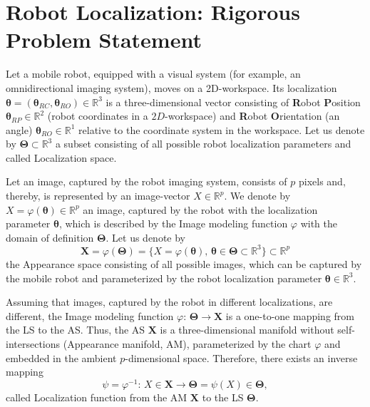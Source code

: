 \documentclass[conference]{IEEEtran} %
\def\mbTheta{{\bm\Theta}}
\def\mbtheta{{\bm\theta}}
\def\mbX{\mathbf{X}}
\def\RR{\mathbb{R}}
\begin{document}
\section{Robot Localization: Rigorous Problem Statement}
\label{sec2}

Let a mobile robot, equipped with a visual system (for example, an omnidirectional imaging system), moves on a 2D-workspace. Its localization $\mbtheta = (\mbtheta_{RC},\mbtheta_{RO})\in\RR^3$ is a three-dimensional vector consisting of \textbf{R}obot \textbf{P}osition $\mbtheta_{RP} \in \RR^2$ (robot coordinates in a $2D$-workspace) and \textbf{R}obot \textbf{O}rientation (an angle) $\mbtheta_{RO}\in\RR^1$ relative to the coordinate system in the workspace. Let us denote by $\mbTheta\subset\RR^3$ a subset consisting of all possible robot localization parameters and called Localization space. 

Let an image, captured by the robot imaging system, consists of $p$ pixels and, thereby, is represented by an image-vector $X \in \RR^p$. We denote by $X =\varphi(\mbtheta)\in\RR^p$ an image, captured by the robot with the localization parameter $\mbtheta$, which is described by the Image modeling function $\varphi$ with the domain of definition $\mbTheta$. Let us denote by
\begin{equation}
\label{eq1}
\mbX = \varphi(\mbTheta) = \{X = \varphi(\mbtheta),\,\mbtheta\in\mbTheta\subset\RR^3\}\subset\RR^p
\end{equation}
the Appearance space consisting of all possible images, which can be captured by the mobile robot and parameterized by the robot localization parameter $\mbtheta\in\RR^3$. 

Assuming that images, captured by the robot in different localizations, are different, the Image modeling function $\varphi:\,\mbTheta\to\mbX$ is a one-to-one mapping from the LS to the AS. Thus, the AS $\mbX$ is a three-dimensional manifold without self-intersections (Appearance manifold, AM), parameterized by the chart $\varphi$ and  embedded in the ambient $p$-dimensional space. Therefore, there exists an inverse mapping
\begin{equation}
\label{eq2}
	\psi = \varphi^{-1}:\,X\in\mbX\to\mbTheta = \psi(X) \in \mbTheta,
\end{equation}
called Localization function from the AM $\mbX$ to the LS $\mbTheta$.
\end{document}
